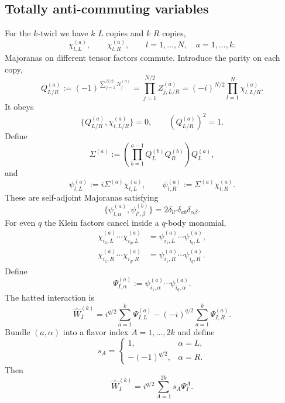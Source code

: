 \documentclass{article}
\theoremstyle{definition}
\begin{document}
\subsection{Totally anti-commuting variables}

For the $k$-twirl we have $k$ $L$ copies and $k$ $R$ copies,
\begin{equation}
    \chi_{l,L}^{(a)},\qquad
    \chi_{l,R}^{(a)},
    \qquad l=1,\ldots,N,\quad a=1,\ldots,k.
\end{equation}
Majoranas on different tensor factors commute.  Introduce the parity on
each copy,
\begin{equation}
    Q_{L/R}^{(a)}
    :=(-1)^{\sum_{j=1}^{N/2}N_j^{(a)}}
    =\prod_{j=1}^{N/2}Z_{j,L/R}^{(a)}
    =(-i)^{N/2}\prod_{l=1}^N\chi_{l,L/R}^{(a)}.
\end{equation}
It obeys
\begin{equation}
    \{Q_{L/R}^{(a)},\chi_{l,L/R}^{(a)}\}=0,
    \qquad
    (Q_{L/R}^{(a)})^2=1.
\end{equation}
Define
\begin{equation}
    \Sigma^{(a)}
    :=\left(\prod_{b=1}^{a-1}Q_L^{(b)}Q_R^{(b)}\right)Q_L^{(a)},
\end{equation}
and
\begin{equation}
    \psi_{l,L}^{(a)}:=i\Sigma^{(a)}\chi_{l,L}^{(a)},
    \qquad
    \psi_{l,R}^{(a)}:=\Sigma^{(a)}\chi_{l,R}^{(a)}.
\end{equation}
These are self-adjoint Majoranas satisfying
\begin{equation}
    \{\psi_{l,\alpha}^{(a)},\psi_{l',\beta}^{(b)}\}
    =2\delta_{ll'}\delta_{ab}\delta_{\alpha\beta}.
\end{equation}
For even $q$ the Klein factors cancel inside a $q$-body monomial,
\begin{align}
    \chi_{i_1,L}^{(a)}\cdots\chi_{i_q,L}^{(a)}
    &=\psi_{i_1,L}^{(a)}\cdots\psi_{i_q,L}^{(a)},
    \nonumber\\
    \chi_{i_1,R}^{(a)}\cdots\chi_{i_q,R}^{(a)}
    &=\psi_{i_1,R}^{(a)}\cdots\psi_{i_q,R}^{(a)}.
\end{align}
Define
\begin{equation}
    \Psi_{I,\alpha}^{(a)}
    :=\psi_{i_1,\alpha}^{(a)}\cdots\psi_{i_q,\alpha}^{(a)}.
\end{equation}
The hatted interaction is
\begin{equation}
    \widehat W_I^{(k)}
    =i^{q/2}\sum_{a=1}^k\Psi_{I,L}^{(a)}
     -(-i)^{q/2}\sum_{a=1}^k\Psi_{I,R}^{(a)}.
\end{equation}
Bundle $(a,\alpha)$ into a flavor index $A=1,\ldots,2k$ and define
\begin{equation}
    s_A=
    \begin{cases}
       1,&\alpha=L,\\
       -(-1)^{q/2},&\alpha=R.
    \end{cases}
\end{equation}
Then
\begin{equation}
    \widehat W_I^{(k)}
    =i^{q/2}\sum_{A=1}^{2k}s_A\Psi_I^A.
\end{equation}
\end{document}
